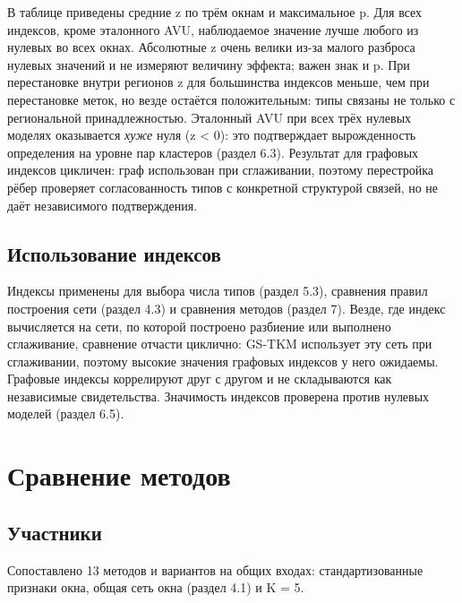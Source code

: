 \documentclass[11pt,a4paper]{article}
\begin{document}
\endgroup

В таблице приведены средние z по трём окнам и максимальное p. Для всех индексов, кроме эталонного AVU, наблюдаемое значение лучше любого из нулевых во всех окнах. Абсолютные z очень велики из-за малого разброса нулевых значений и не измеряют величину эффекта; важен знак и p. При перестановке внутри регионов z для большинства индексов меньше, чем при перестановке меток, но везде остаётся положительным: типы связаны не только с региональной принадлежностью. Эталонный AVU при всех трёх нулевых моделях оказывается \emph{хуже} нуля (z \textless{} 0): это подтверждает вырожденность определения на уровне пар кластеров (раздел 6.3). Результат для графовых индексов цикличен: граф использован при сглаживании, поэтому перестройка рёбер проверяет согласованность типов с конкретной структурой связей, но не даёт независимого подтверждения.

\subsection{Использование индексов}\label{ux438ux441ux43fux43eux43bux44cux437ux43eux432ux430ux43dux438ux435-ux438ux43dux434ux435ux43aux441ux43eux432}

Индексы применены для выбора числа типов (раздел 5.3), сравнения правил построения сети (раздел 4.3) и сравнения методов (раздел 7). Везде, где индекс вычисляется на сети, по которой построено разбиение или выполнено сглаживание, сравнение отчасти циклично: GS-TKM использует эту сеть при сглаживании, поэтому высокие значения графовых индексов у него ожидаемы. Графовые индексы коррелируют друг с другом и не складываются как независимые свидетельства. Значимость индексов проверена против нулевых моделей (раздел 6.5).

\section{Сравнение методов}\label{ux441ux440ux430ux432ux43dux435ux43dux438ux435-ux43cux435ux442ux43eux434ux43eux432}

\subsection{Участники}\label{ux443ux447ux430ux441ux442ux43dux438ux43aux438}

Сопоставлено 13 методов и вариантов на общих входах: стандартизованные признаки окна, общая сеть окна (раздел 4.1) и K = 5.
\end{document}
